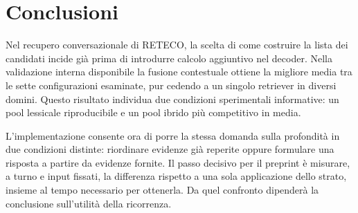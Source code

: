 \section{Conclusioni}
Nel recupero conversazionale di RETECO, la scelta di come costruire la lista dei candidati incide già prima di introdurre calcolo aggiuntivo nel decoder. Nella validazione interna disponibile la fusione contestuale ottiene la migliore media tra le sette configurazioni esaminate, pur cedendo a un singolo retriever in diversi domini. Questo risultato individua due condizioni sperimentali informative: un pool lessicale riproducibile e un pool ibrido più competitivo in media.

L'implementazione consente ora di porre la stessa domanda sulla profondità in due condizioni distinte: riordinare evidenze già reperite oppure formulare una risposta a partire da evidenze fornite. Il passo decisivo per il preprint è misurare, a turno e input fissati, la differenza rispetto a una sola applicazione dello strato, insieme al tempo necessario per ottenerla. Da quel confronto dipenderà la conclusione sull'utilità della ricorrenza.

